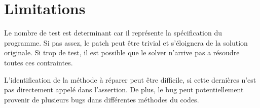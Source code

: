 \chapter{Limitations}
	\thispagestyle{limitation}
	
\par Le nombre de test est determinant car il représente la spécification du programme. Si pas assez, le patch peut être trivial et s'éloignera de la solution originale. Si trop de test, il est possible que le solver n'arrive pas a résoudre toutes ces contraintes.

\par L'identification de la méthode à réparer peut être difficile, si cette dernières n'est pas directement appelé dans l'assertion. De plus, le bug peut potentiellement provenir de plusieurs bugs dans différentes méthodes du codes.